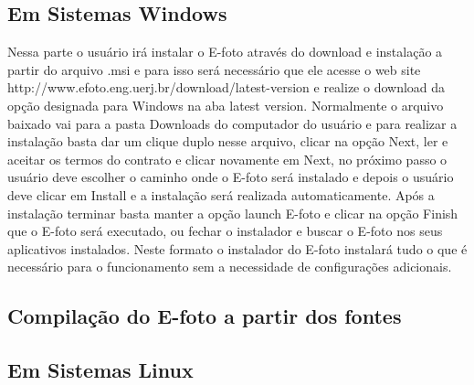 \subsection{Em Sistemas Windows}
Nessa parte o usuário irá instalar o E-foto através do download e instalação a partir do arquivo .msi e para isso será necessário que ele acesse o web site http://www.efoto.eng.uerj.br/download/latest-version e realize o download da opção designada para Windows na aba latest version. Normalmente o arquivo baixado vai para a pasta Downloads do computador do usuário e para realizar a instalação basta dar um clique duplo nesse arquivo, clicar na opção Next, ler e aceitar os termos do contrato e clicar novamente em Next, no próximo passo o usuário deve escolher o caminho onde o E-foto será instalado e depois o usuário deve clicar em Install e a instalação será realizada automaticamente. Após a instalação terminar basta manter a opção launch E-foto e clicar na opção Finish que o E-foto será executado, ou fechar o instalador e buscar o E-foto nos seus aplicativos instalados. Neste formato o instalador do E-foto instalará tudo o que é necessário para o funcionamento sem a necessidade de configurações adicionais.

\subsection{Compilação do E-foto a partir dos fontes}
\subsection{Em Sistemas Linux}

